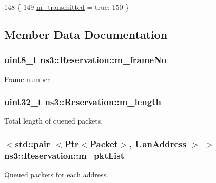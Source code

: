\begin{DoxyCode}
148 \{
149   \hyperlink{classns3_1_1Reservation_a38ee2269226398d71147fc893cc39c96}{m\_transmitted} = \textcolor{keyword}{true};
150 \}
\end{DoxyCode}


\subsection{Member Data Documentation}
\subsubsection[{\texorpdfstring{m\+\_\+frame\+No}{m_frameNo}}]{\setlength{\rightskip}{0pt plus 5cm}uint8\+\_\+t ns3\+::\+Reservation\+::m\+\_\+frame\+No\hspace{0.3cm}{\ttfamily [private]}}\hypertarget{classns3_1_1Reservation_aa346acbdd7322ad8897716f7b9a1e52c}{}\label{classns3_1_1Reservation_aa346acbdd7322ad8897716f7b9a1e52c}
Frame number. 
\subsubsection[{\texorpdfstring{m\+\_\+length}{m_length}}]{\setlength{\rightskip}{0pt plus 5cm}uint32\+\_\+t ns3\+::\+Reservation\+::m\+\_\+length\hspace{0.3cm}{\ttfamily [private]}}\hypertarget{classns3_1_1Reservation_aaf518d264c53d097ad13482d3d28e705}{}\label{classns3_1_1Reservation_aaf518d264c53d097ad13482d3d28e705}
Total length of queued packets. 
\subsubsection[{\texorpdfstring{m\+\_\+pkt\+List}{m_pktList}}]{$<$std\+::pair $<${\bf Ptr}$<${\bf Packet}$>$, {\bf Uan\+Address} $>$ $>$ ns3\+::\+Reservation\+::m\+\_\+pkt\+List\hspace{0.3cm}{\ttfamily [private]}}\hypertarget{classns3_1_1Reservation_a8fa52e513a05f8afa950af135d0cd2be}{}\label{classns3_1_1Reservation_a8fa52e513a05f8afa950af135d0cd2be}
Queued packets for each address. 
